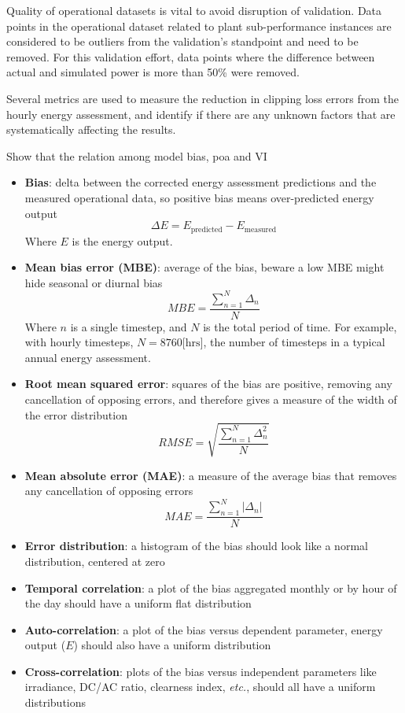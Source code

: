 \documentclass[conference]{IEEEtran}
\begin{document}
Quality of operational datasets is vital to avoid disruption of validation. Data points in the operational dataset related to plant sub-performance instances are considered to be outliers from the validation's standpoint and need to be removed. For this validation effort, data points where the difference between actual and simulated power is more than 50\% were removed. 


Several metrics are used to measure the reduction in clipping loss errors from the hourly energy assessment, and identify if there are any unknown factors that are systematically affecting the results.

\color{red} Show that the relation among model bias, poa and VI
\begin{itemize}
\item \textbf{Bias}: delta between the corrected energy assessment predictions and the measured operational data, so positive bias means over-predicted energy output 
\begin{equation}
\Delta E={E_\text{predicted}} - {E_\text{measured}}\label{eq:bias}
\end{equation}
Where $E$ is the energy output.
\item \textbf{Mean bias error (MBE)}: average of the bias, beware a low MBE might hide seasonal or diurnal bias
\begin{equation}
\mathit{MBE}=\frac{\sum_{n=1}^N{\Delta_n}}{N}\label{eq:mbe}
\end{equation}
Where $n$ is a single timestep, and $N$ is the total period of time. For example, with hourly timesteps, $N=8760\text{[hrs]}$, the number of timesteps in a typical annual energy assessment.
\item \textbf{Root mean squared error}: squares of the bias are positive, removing any cancellation of opposing errors, and therefore gives a measure of the width of the error distribution
\begin{equation}
\mathit{RMSE}=\sqrt{\frac{\sum_{n=1}^N{\Delta_n^2}}{N}}\label{eq:rmse}
\end{equation}
\item \textbf{Mean absolute error (MAE)}: a measure of the average bias that removes any cancellation of opposing errors
\begin{equation}
\mathit{MAE}=\frac{\sum_{n=1}^N{\left|\Delta_n\right|}}{N}\label{eq:mae}
\end{equation}
\item \textbf{Error distribution}: a histogram of the bias should look like a normal distribution, centered at zero
\item \textbf{Temporal correlation}: a plot of the bias aggregated monthly or by hour of the day should have a uniform flat distribution
\item \textbf{Auto-correlation}: a plot of the bias versus dependent parameter, energy output ($E$) should also have a uniform distribution
\item \textbf{Cross-correlation}: plots of the bias versus independent parameters like irradiance, DC/AC ratio, clearness index, \textit{etc.}, should all have a uniform distributions
\end{itemize}
\end{document}
